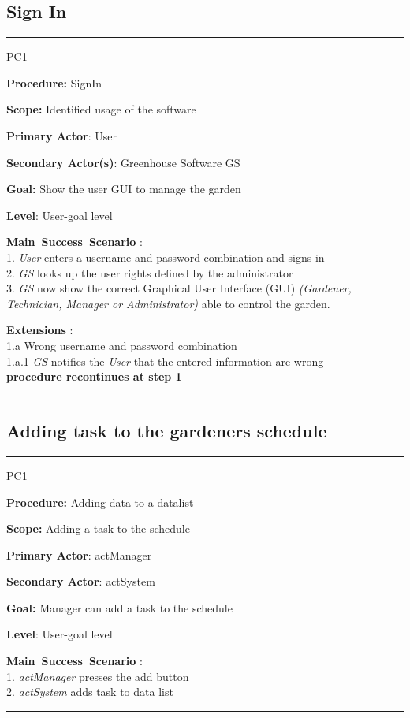 \break


\subsection{Sign In}
\vspace{0.5cm}
\hrule
\hfill \break
\begin{lyxlist}{PC1}
\small{
\item [\textbf{Procedure:}] SignIn
\item [\textbf{Scope:}] Identified usage of the software
\item [\textbf{Primary Actor}:] User
\item [\textbf{Secondary Actor(s)}:] Greenhouse Software GS
\item [\textbf{Goal:}] Show the user GUI to manage the garden
\item [\textbf{Level}:] User-goal level
\item [\textbf{Main~Success~Scenario}]:\\
1. \emph{User} enters a username and password combination and signs in\\
2. \emph{GS} looks up the user rights defined by the administrator\\
3. \emph{GS} now show the correct Graphical User Interface (GUI) \emph{(Gardener, Technician, Manager or Administrator)} able to control the garden.
\item [\textbf{Extensions}]:\\
1.a Wrong username and password combination\\
\hspace*{0.5cm} 1.a.1 \emph{GS} notifies the \emph{User} that the entered information are wrong\\
\hspace*{0.5cm} \textbf{procedure recontinues at step 1}
}
\end{lyxlist}
\hrule
\vspace{0.5cm}


\subsection{Adding task to the gardeners schedule}
\vspace{0.5cm}
\hfill \break
\hrule
\begin{lyxlist}{PC1}
\small{
\item [\textbf{Procedure:}] Adding data to a datalist
\item [\textbf{Scope:}] Adding a task to the schedule
\item [\textbf{Primary Actor}:] actManager
\item [\textbf{Secondary Actor}:] actSystem
\item [\textbf{Goal:}] Manager can add a task to the schedule
\item [\textbf{Level}:] User-goal level
\item [\textbf{Main~Success~Scenario}]:\\
1. \emph{actManager} presses the add button\\
2. \emph{actSystem} adds task to data list\\
}
\end{lyxlist}
\hrule
\vspace{0.5cm}

